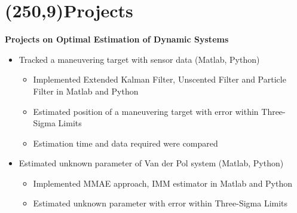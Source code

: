 \documentclass[10pt,a4paper]{extarticle}
\begin{document}
\section*{\colorbox{gray!10}{\makebox(250,9){\textcolor{blue!65}{Projects\hfill}}}}
\textbf{Projects on Optimal Estimation of Dynamic Systems}
\vspace{-0.4em}
\begin{itemize}[leftmargin = 0.6cm]
\setlength\itemsep{-0.2em}
\item Tracked a maneuvering target with sensor data (Matlab, Python)
\vspace{-0.6em}
\begin{itemize}[leftmargin = 0.3cm]
\setlength\itemsep{-0.2em}
\item Implemented Extended Kalman Filter, Unscented Filter and Particle Filter in Matlab and Python
\item Estimated position of a maneuvering target with error within Three-Sigma Limits
\item Estimation time and data required were compared
\end{itemize}
\item Estimated unknown parameter of Van der Pol system (Matlab, Python)
\vspace{-0.6em}
\begin{itemize}[leftmargin = 0.3cm]
\setlength\itemsep{-0.2em}
\item Implemented MMAE approach, IMM estimator in Matlab and Python
\item Estimated unknown parameter with error within Three-Sigma Limits
\end{itemize}

\end{itemize}
\end{document}
